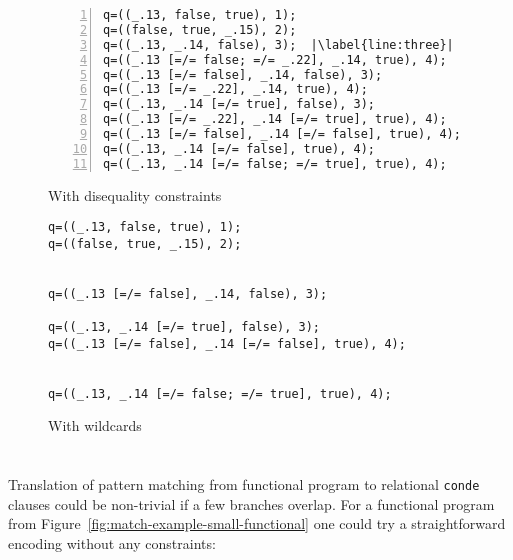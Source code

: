 \begin{figure*}[t!]
\begin{subfigure}{0.49\textwidth}
\begin{lstlisting}[escapechar=|,numbers=left]
q=((_.13, false, true), 1);
q=((false, true, _.15), 2);
q=((_.13, _.14, false), 3);  |\label{line:three}|
q=((_.13 [=/= false; =/= _.22], _.14, true), 4);
q=((_.13 [=/= false], _.14, false), 3);
q=((_.13 [=/= _.22], _.14, true), 4);
q=((_.13, _.14 [=/= true], false), 3);
q=((_.13 [=/= _.22], _.14 [=/= true], true), 4);        |\label{line:eight}|
q=((_.13 [=/= false], _.14 [=/= false], true), 4);
q=((_.13, _.14 [=/= false], true), 4);                  |\label{line:ten}|
q=((_.13, _.14 [=/= false; =/= true], true), 4);
\end{lstlisting}
\caption{With disequality constraints}
\end{subfigure}
\begin{subfigure}{0.49\textwidth}
\begin{lstlisting}
q=((_.13, false, true), 1);
q=((false, true, _.15), 2);


q=((_.13 [=/= false], _.14, false), 3);

q=((_.13, _.14 [=/= true], false), 3);
q=((_.13 [=/= false], _.14 [=/= false], true), 4);


q=((_.13, _.14 [=/= false; =/= true], true), 4);
\end{lstlisting}
\caption{With wildcards}
\end{subfigure}
\caption{The output of running two encodings from Figure~\ref{fig:maranget-example-compilation} where scrutinee is a triple of three fresh variables \lstinline|(_.13, _.14, _.15)|. One can observe that disequality constraints generate more (bogus) answers. Also, the last answer raises the idea that finite domain constraints may be useful for that example.}
\label{fig:matching-maranget-compilation}
\end{figure*}

\section{\noCanren{}}
\label{sec:noCanren}

Translation of pattern matching from functional program to relational \lstinline|conde| clauses could be non-trivial if a few branches overlap. 
For a functional program from Figure~\ref{fig:match-example-small-functional} one could try a straightforward encoding without any constraints:

